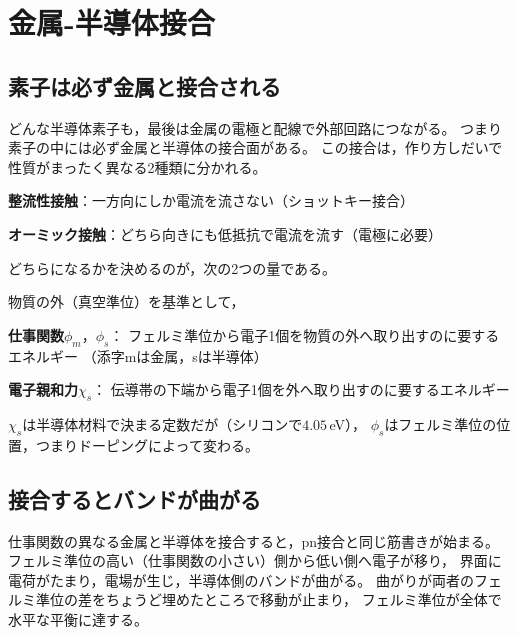 \section{金属-半導体接合}
\label{sec1.7}

\subsection{素子は必ず金属と接合される}

どんな半導体素子も，最後は金属の電極と配線で外部回路につながる。
つまり素子の中には必ず金属と半導体の接合面がある。
この接合は，作り方しだいで性質がまったく異なる2種類に分かれる。

\begin{箇条書}
\item \textbf{整流性接触}：一方向にしか電流を流さない（ショットキー接合）
\item \textbf{オーミック接触}：どちら向きにも低抵抗で電流を流す（電極に必要）
\end{箇条書}

どちらになるかを決めるのが，次の2つの量である。

\begin{定義}[仕事関数と電子親和力]
\label{def1.4}
物質の外（真空準位）を基準として，
\begin{箇条書}
\item {}\textbf{仕事関数}$\phi_m$，$\phi_s$：
フェルミ準位から電子1個を物質の外へ取り出すのに要するエネルギー
（添字mは金属，sは半導体）
\item {}\textbf{電子親和力}$\chi_s$：
伝導帯の下端から電子1個を外へ取り出すのに要するエネルギー
\end{箇条書}
$\chi_s$は半導体材料で決まる定数だが（シリコンで$4.05$\,eV），
$\phi_s$はフェルミ準位の位置，つまりドーピングによって変わる。
\end{定義}

\subsection{接合するとバンドが曲がる}

仕事関数の異なる金属と半導体を接合すると，pn接合と同じ筋書きが始まる。
フェルミ準位の高い（仕事関数の小さい）側から低い側へ電子が移り，
界面に電荷がたまり，電場が生じ，半導体側のバンドが曲がる。
曲がりが両者のフェルミ準位の差をちょうど埋めたところで移動が止まり，
フェルミ準位が全体で水平な平衡に達する。

